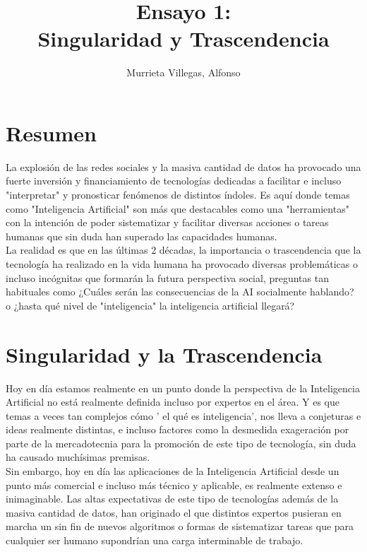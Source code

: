 \documentclass[11pt]{article}
\title{Ensayo 1:\\ Singularidad y Trascendencia}
\author{Murrieta Villegas, Alfonso}
\begin{document}
\maketitle

\section{Resumen}

La explosión de las redes sociales y la masiva cantidad de datos ha provocado una fuerte inversión y financiamiento de tecnologías dedicadas a facilitar e incluso "interpretar" y pronosticar fenómenos de distintos índoles. Es aquí donde temas como "Inteligencia Artificial" son más que destacables como una "herramientas" con la intención de poder sistematizar y facilitar diversas acciones o tareas humanas que sin duda han superado las capacidades humanas.\\

La realidad es que en las últimas 2 décadas, la importancia o trascendencia que la tecnología ha realizado en la vida humana ha provocado diversas problemáticas o incluso incógnitas que formarán la futura perspectiva social, preguntas tan habituales como ¿Cuáles serán las consecuencias de la AI socialmente hablando? o ¿hasta qué nivel de "inteligencia" la inteligencia artificial llegará?

\section{Singularidad y la Trascendencia }

Hoy en día estamos realmente en un punto donde la perspectiva de la Inteligencia Artificial no está realmente definida incluso por expertos en el área. Y es que temas a veces tan complejos cómo ' el qué es inteligencia', nos lleva a conjeturas e ideas realmente distintas, e incluso factores como la desmedida exageración por parte de la mercadotecnia para la promoción de este tipo de tecnología, sin duda ha causado muchísimas premisas.\\

Sin embargo, hoy en día las aplicaciones de la Inteligencia Artificial desde un punto más comercial e incluso más técnico y aplicable, es realmente extenso e inimaginable. Las altas expectativas de este tipo de tecnologías además de la masiva cantidad de datos, han originado el que distintos expertos pusieran en marcha un sin fin de nuevos algoritmos o formas de sistematizar tareas que para cualquier ser humano supondrían una carga interminable de trabajo.\\
\end{document}
